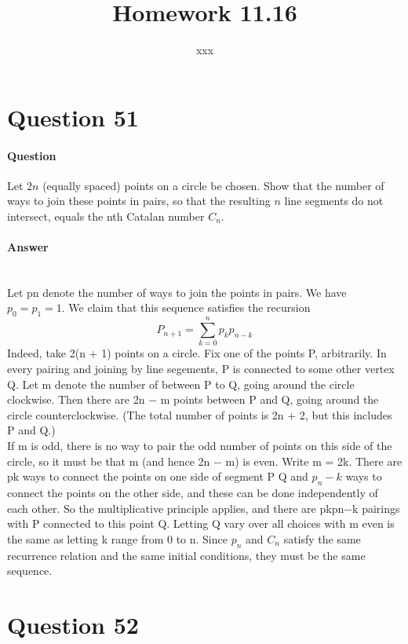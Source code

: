 \documentclass[UTF8]{article}
\title{Homework 11.16}
\author{xxx}
\date{}
\begin{document}
\maketitle
\section{Question 51}
\paragraph{Question}
Let $ 2n $ (equally spaced) points on a circle be chosen. Show
that the number of ways to join these points in pairs, so that the resulting $ n $ line
segments do not intersect, equals the nth Catalan number $ C_n $.
\paragraph{Answer}
    ~\\
    Let pn denote the number of ways to join the points in pairs. We have $p_0 = p_1 =
1$. We claim that this sequence satisfies the recursion
    $$ P_{n +1} = \sum_{k = 0}^n p_k p_{n - k} $$
    Indeed, take 2(n + 1) points on a circle. Fix one of the points P, arbitrarily.
In every pairing and joining by line segements, P is connected to some other
vertex Q. Let m denote the number of between P to Q, going around the circle
clockwise. Then there are 2n − m points between P and Q, going around the
circle counterclockwise. (The total number of points is 2n + 2, but this includes
P and Q.) \\
If m is odd, there is no way to pair the odd number of points on this side of the
circle, so it must be that m (and hence 2n − m) is even. Write m = 2k. There
are pk ways to connect the points on one side of segment P Q and $p_n−k$ ways
to connect the points on the other side, and these can be done independently of
each other. So the multiplicative principle applies, and there are pkpn−k pairings
with P connected to this point Q. Letting Q vary over all choices with m even
is the same as letting k range from 0 to n.
Since $ p_n $ and $ C_n $ satisfy the same recurrence relation and the same initial conditions,
they must be the same sequence.

\section{Question 52}
\end{document}
